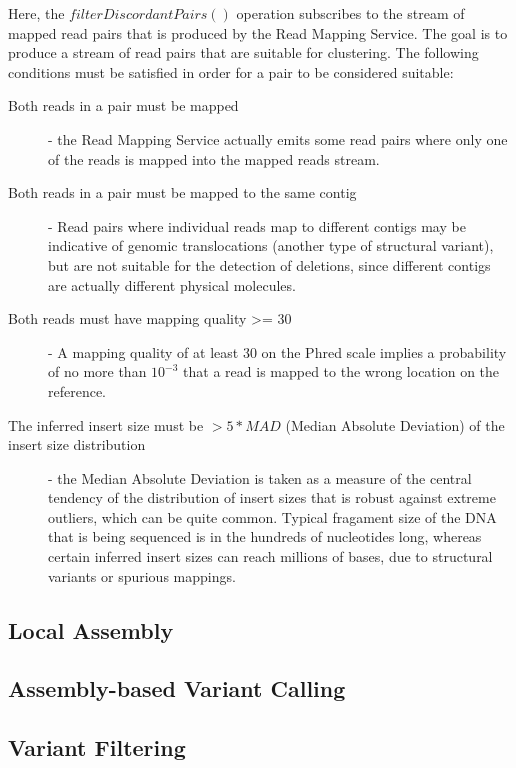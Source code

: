 Here, the $filterDiscordantPairs()$ operation subscribes to the stream of mapped read pairs that is produced by the Read Mapping Service. The goal is to produce a stream of read pairs that are suitable for clustering. The following conditions must be satisfied in order for a pair to be considered suitable:

\begin{description}
    \item [Both reads in a pair must be mapped] - the Read Mapping Service actually emits some read pairs where only one of the reads is mapped into the mapped reads stream.
    \item [Both reads in a pair must be mapped to the same contig] - Read pairs where individual reads map to different contigs may be indicative of genomic translocations (another type of structural variant), but are not suitable for the detection of deletions, since different contigs are actually different physical molecules.
    \item [Both reads must have mapping quality >= 30] - A mapping quality of at least 30 on the Phred scale implies a probability of no more than $10^{-3}$ that a read is mapped to the wrong location on the reference.
    \item [The inferred insert size must be $> 5 * MAD$ (Median Absolute Deviation) of the insert size distribution] - the Median Absolute Deviation is taken as a measure of the central tendency of the distribution of insert sizes that is robust against extreme outliers, which can be quite common. Typical fragament size of the DNA that is being sequenced is in the hundreds of nucleotides long, whereas certain inferred insert sizes can reach millions of bases, due to structural variants or spurious mappings. 
\end{description}

\subsection{Local Assembly}

\subsection{Assembly-based Variant Calling}

\subsection{Variant Filtering}

